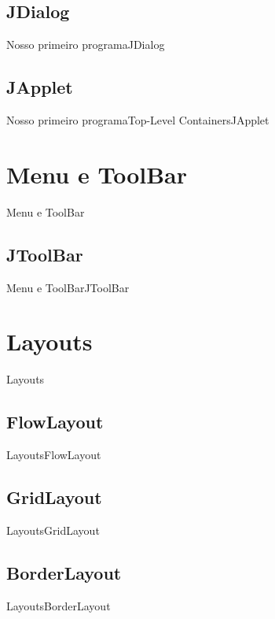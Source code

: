 \documentclass[10pt]{beamer}
\begin{document}
\subsection{JDialog}
\begin{frame}{Nosso primeiro programa}{JDialog}
\end{frame}{}

\subsection{JApplet}
\begin{frame}{Nosso primeiro programa}{Top-Level Containers}{JApplet}
\end{frame}{}


\section{Menu e ToolBar}
\begin{frame}{Menu e ToolBar}{}
\end{frame}{}

\subsection{JToolBar}
\begin{frame}{Menu e ToolBar}{JToolBar}
\end{frame}{}


\section{Layouts}
\begin{frame}{Layouts}{}
\end{frame}{}

\subsection{FlowLayout}
\begin{frame}{Layouts}{FlowLayout}
\end{frame}{}

\subsection{GridLayout}
\begin{frame}{Layouts}{GridLayout}
\end{frame}{}

\subsection{BorderLayout}
\begin{frame}{Layouts}{BorderLayout}
\end{frame}{}
\end{document}
